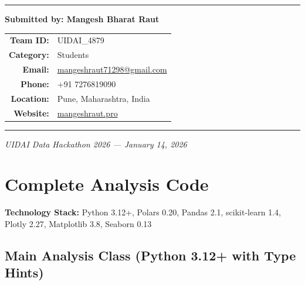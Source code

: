 \documentclass[12pt,a4paper]{article}
\begin{document}
\begin{center}
\rule{0.6\textwidth}{0.4pt}

\vspace{0.5cm}

\textbf{\Large Submitted by: Mangesh Bharat Raut}\\[0.4cm]
\begin{tabular}{rl}
\textbf{Team ID:} & UIDAI\_4879 \\[0.2cm]
\textbf{Category:} & Students \\[0.2cm]
\textbf{Email:} & \href{mailto:mangeshraut71298@gmail.com}{mangeshraut71298@gmail.com} \\[0.2cm]
\textbf{Phone:} & +91 7276819090 \\[0.2cm]
\textbf{Location:} & Pune, Maharashtra, India \\[0.2cm]
\textbf{Website:} & \href{https://mangeshraut.pro/}{mangeshraut.pro} \\
\end{tabular}

\vspace{0.5cm}

\rule{0.6\textwidth}{0.4pt}

\vspace{0.3cm}

{\small\textit{UIDAI Data Hackathon 2026 --- January 14, 2026}}

\end{center}

\newpage

\appendix
\section{Complete Analysis Code}

\textbf{Technology Stack:} Python 3.12+, Polars 0.20, Pandas 2.1, scikit-learn 1.4, Plotly 2.27, Matplotlib 3.8, Seaborn 0.13

\subsection{Main Analysis Class (Python 3.12+ with Type Hints)}
\end{document}
